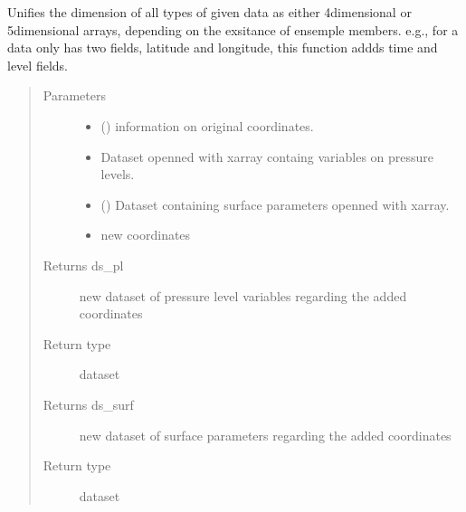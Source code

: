 \documentclass[a4paper,11pt,english]{sphinxmanual}
\begin{document}
\begin{fulllineitems}
\label{\detokenize{envlib:envlib.extend_dim.extend_dimensions}}
\sphinxAtStartPar
Unifies the dimension of all types of given data as either 4\sphinxhyphen{}dimensional or 5\sphinxhyphen{}dimensional arrays, depending on
the exsitance of ensemple members. e.g., for a data only has two fields, latitude and longitude, this function
addds time and level fields.
\begin{quote}\begin{description}
\item[{Parameters}] \leavevmode\begin{itemize}
\item {} 
\sphinxAtStartPar
{} () \textendash{} information on original coordinates.

\item {} 
\sphinxAtStartPar
{} \textendash{} Dataset openned with xarray containg variables on pressure levels.

\item {} 
\sphinxAtStartPar
{} () \textendash{} Dataset containing surface parameters openned with xarray.

\item {} 
\sphinxAtStartPar
{} \textendash{} new coordinates

\end{itemize}

\item[{Returns ds\_pl}] \leavevmode
\sphinxAtStartPar
new dataset of pressure level variables regarding the added coordinates

\item[{Return type}] \leavevmode
\sphinxAtStartPar
dataset

\item[{Returns ds\_surf}] \leavevmode
\sphinxAtStartPar
new dataset of surface parameters regarding the added coordinates

\item[{Return type}] \leavevmode
\sphinxAtStartPar
dataset

\end{description}\end{quote}

\end{fulllineitems}
\end{document}
